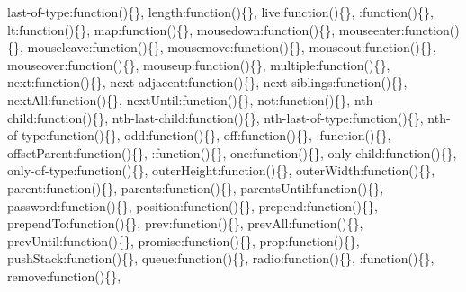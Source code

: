 {\begin{DoxyParamCaption}
\textquotesingle{}last-\/of-\/type\textquotesingle{}\+:function()\{\}, \textquotesingle{}length\textquotesingle{}\+:function()\{\}, \textquotesingle{}live\textquotesingle{}\+:function()\{\}, \textquotesingle{}\+:function()\{\}, \textquotesingle{}lt\textquotesingle{}\+:function()\{\}, \textquotesingle{}map\textquotesingle{}\+:function()\{\}, \textquotesingle{}mousedown\textquotesingle{}\+:function()\{\}, \textquotesingle{}mouseenter\textquotesingle{}\+:function()\{\}, \textquotesingle{}mouseleave\textquotesingle{}\+:function()\{\}, \textquotesingle{}mousemove\textquotesingle{}\+:function()\{\}, \textquotesingle{}mouseout\textquotesingle{}\+:function()\{\}, \textquotesingle{}mouseover\textquotesingle{}\+:function()\{\}, \textquotesingle{}mouseup\textquotesingle{}\+:function()\{\}, \textquotesingle{}multiple\textquotesingle{}\+:function()\{\}, \textquotesingle{}next\textquotesingle{}\+:function()\{\}, \textquotesingle{}next adjacent\textquotesingle{}\+:function()\{\}, \textquotesingle{}next siblings\textquotesingle{}\+:function()\{\}, \textquotesingle{}next\+All\textquotesingle{}\+:function()\{\}, \textquotesingle{}next\+Until\textquotesingle{}\+:function()\{\}, \textquotesingle{}not\textquotesingle{}\+:function()\{\}, \textquotesingle{}nth-\/child\textquotesingle{}\+:function()\{\}, \textquotesingle{}nth-\/last-\/child\textquotesingle{}\+:function()\{\}, \textquotesingle{}nth-\/last-\/of-\/type\textquotesingle{}\+:function()\{\}, \textquotesingle{}nth-\/of-\/type\textquotesingle{}\+:function()\{\}, \textquotesingle{}odd\textquotesingle{}\+:function()\{\}, \textquotesingle{}off\textquotesingle{}\+:function()\{\}, \textquotesingle{}\+:function()\{\}, \textquotesingle{}offset\+Parent\textquotesingle{}\+:function()\{\}, \textquotesingle{}\+:function()\{\}, \textquotesingle{}one\textquotesingle{}\+:function()\{\}, \textquotesingle{}only-\/child\textquotesingle{}\+:function()\{\}, \textquotesingle{}only-\/of-\/type\textquotesingle{}\+:function()\{\}, \textquotesingle{}outer\+Height\textquotesingle{}\+:function()\{\}, \textquotesingle{}outer\+Width\textquotesingle{}\+:function()\{\}, \textquotesingle{}parent\textquotesingle{}\+:function()\{\}, \textquotesingle{}parents\textquotesingle{}\+:function()\{\}, \textquotesingle{}parents\+Until\textquotesingle{}\+:function()\{\}, \textquotesingle{}password\textquotesingle{}\+:function()\{\}, \textquotesingle{}position\textquotesingle{}\+:function()\{\}, \textquotesingle{}prepend\textquotesingle{}\+:function()\{\}, \textquotesingle{}prepend\+To\textquotesingle{}\+:function()\{\}, \textquotesingle{}prev\textquotesingle{}\+:function()\{\}, \textquotesingle{}prev\+All\textquotesingle{}\+:function()\{\}, \textquotesingle{}prev\+Until\textquotesingle{}\+:function()\{\}, \textquotesingle{}promise\textquotesingle{}\+:function()\{\}, \textquotesingle{}prop\textquotesingle{}\+:function()\{\}, \textquotesingle{}push\+Stack\textquotesingle{}\+:function()\{\}, \textquotesingle{}queue\textquotesingle{}\+:function()\{\}, \textquotesingle{}radio\textquotesingle{}\+:function()\{\}, \textquotesingle{}\+:function()\{\}, \textquotesingle{}remove\textquotesingle{}\+:function()\{\}, 
\end{DoxyParamCaption}}

